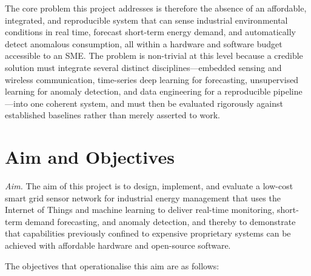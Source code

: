 \documentclass[conference]{IEEEtran}
\begin{document}
The core problem this project addresses is therefore the absence of an
affordable, integrated, and reproducible system that can sense industrial
environmental conditions in real time, forecast short-term energy demand, and
automatically detect anomalous consumption, all within a hardware and software
budget accessible to an SME. The problem is non-trivial at this level because a
credible solution must integrate several distinct disciplines---embedded sensing
and wireless communication, time-series deep learning for forecasting,
unsupervised learning for anomaly detection, and data engineering for a
reproducible pipeline---into one coherent system, and must then be evaluated
rigorously against established baselines rather than merely asserted to work.
 
\section{Aim and Objectives}\label{sec:aims}
 
\textit{Aim.} The aim of this project is to design, implement, and evaluate a
low-cost smart grid sensor network for industrial energy management that uses
the Internet of Things and machine learning to deliver real-time monitoring,
short-term demand forecasting, and anomaly detection, and thereby to demonstrate
that capabilities previously confined to expensive proprietary systems can be
achieved with affordable hardware and open-source software.
 
\noindent The objectives that operationalise this aim are as follows:
 
\end{document}
